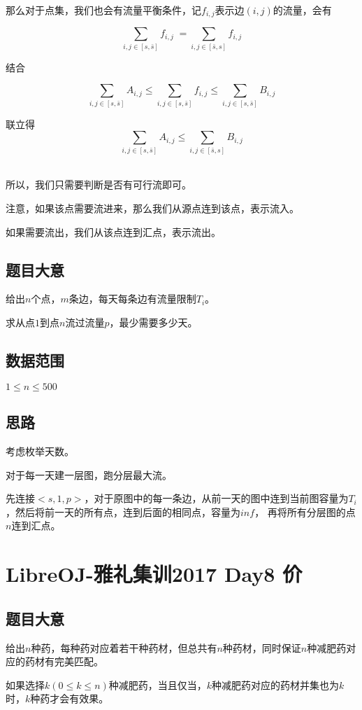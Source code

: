 \documentclass{ctexart}
\numberwithin{equation}{section}
\begin{document}
\begin{flushleft}
  那么对于点集，我们也会有流量平衡条件，记$f_{i,j}$表示边$(i,j)$的流量，会有

  $$\sum_{i,j\in[s,\bar{s}]}f_{i,j}\;=\sum_{i,j\in[\bar{s},s]}f_{i,j}$$

  结合

  $$\sum_{i,j\in [s,\bar{s}]}A_{i,j} \le \sum_{i,j\in [s,\bar{s}]}f_{i,j} \le \sum_{i,j\in [s,\bar{s}]}B_{i,j}$$

  联立得$$\sum_{i,j\in [s, \bar{s}]} A_{i,j} \le \sum_{i,j\in [\bar{s},s]} B_{i,j}$$

  ~\\
  
  所以，我们只需要判断是否有可行流即可。

  注意，如果该点需要流进来，那么我们从源点连到该点，表示流入。

  如果需要流出，我们从该点连到汇点，表示流出。
  
  \newpage

  \subsection{题目大意}
  给出$n$个点，$m$条边，每天每条边有流量限制$T_i$。

  求从点$1$到点$n$流过流量$p$，最少需要多少天。
  \subsection{数据范围}
  $1\le n \le 500$
  \subsection{思路}
  考虑枚举天数。

  对于每一天建一层图，跑分层最大流。

  先连接$<s,1,p>$，对于原图中的每一条边，从前一天的图中连到当前图容量为$T_i$，然后将前一天的所有点，连到后面的相同点，容量为$inf$，
  再将所有分层图的点$n$连到汇点。
  \newpage

  \section{LibreOJ-雅礼集训2017 Day8 价}
  \subsection{题目大意}
  给出$n$种药，每种药对应着若干种药材，但总共有$n$种药材，同时保证$n$种减肥药对应的药材有完美匹配。

  如果选择$k(0\le k\le n)$种减肥药，当且仅当，$k$种减肥药对应的药材并集也为$k$时，$k$种药才会有效果。


\end{flushleft}
\end{document}
